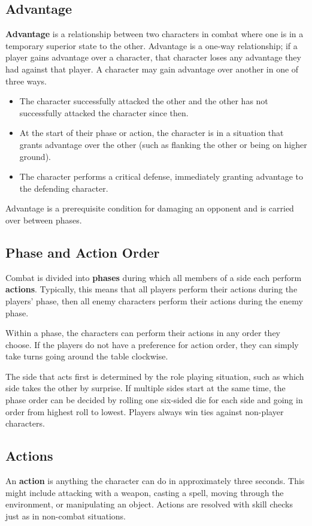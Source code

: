 \documentclass[11pt]{article}
\begin{document}
\subsection{Advantage}
\textbf{Advantage} is a relationship between two characters in combat where one is in a temporary superior state to the other.
Advantage is a one-way relationship; if a player gains advantage over a character, that character loses any advantage they had against that player.
A character may gain advantage over another in one of three ways.

\begin{itemize}
	\item The character successfully attacked the other and the other has not successfully attacked the character since then.
	\item At the start of their phase or action, the character is in a situation that grants advantage over the other (such as flanking the other or being on higher ground).
	\item The character performs a critical defense, immediately granting advantage to the defending character.
\end{itemize}

Advantage is a prerequisite condition for damaging an opponent and is carried over between phases.

\subsection{Phase and Action Order}
Combat is divided into \textbf{phases} during which all members of a side each perform \textbf{actions}.
Typically, this means that all players perform their actions during the players' phase, then all enemy characters perform their actions during the enemy phase.

Within a phase, the characters can perform their actions in any order they choose.
If the players do not have a preference for action order, they can simply take turns going around the table clockwise.

The side that acts first is determined by the role playing situation, such as which side takes the other by surprise.
If multiple sides start at the same time, the phase order can be decided by rolling one six-sided die for each side and going in order from highest roll to lowest.
Players always win ties against non-player characters.

\subsection{Actions}
An \textbf{action} is anything the character can do in approximately three seconds.
This might include attacking with a weapon, casting a spell, moving through the environment, or manipulating an object.
Actions are resolved with skill checks just as in non-combat situations.
\end{document}
